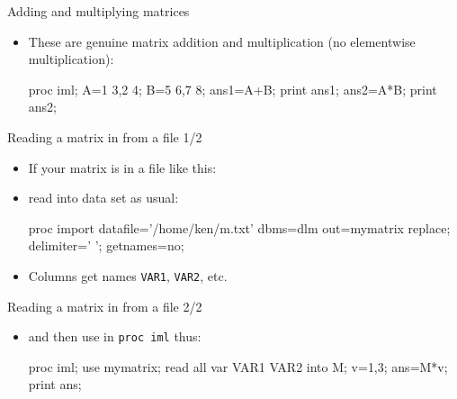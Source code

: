 \documentclass[unknownkeysallowed]{beamer}\usepackage[]{graphicx}\usepackage[]{color}
\begin{document}
\begin{frame}[fragile]{Adding and multiplying matrices}
  
  \begin{itemize}
  \item These are genuine matrix addition and multiplication (no
    elementwise multiplication):
    
    \begin{Sascode}[store=ime]
proc iml;
  A={1 3,2 4};
  B={5 6,7 8};
  ans1=A+B; 
  print ans1;
  ans2=A*B;
  print ans2;
    \end{Sascode}
    
    
  \end{itemize}
  
\end{frame}

\begin{frame}[fragile]{Reading a matrix in from a file 1/2}
  
  \begin{itemize}
  \item If your matrix is in a file like this:
    

\item read into data set as usual:
  
    \begin{Datastep}
proc import
  datafile='/home/ken/m.txt'
    dbms=dlm
    out=mymatrix
    replace;
  delimiter=' ';
  getnames=no; 
    \end{Datastep}
    
  \item Columns get names \texttt{VAR1}, \texttt{VAR2}, etc.
    
  \end{itemize}
  
\end{frame}


\begin{frame}[fragile]{Reading a matrix in from a file 2/2}
  
  \begin{itemize}
  \item and then use in \texttt{proc iml} thus:
    
    \begin{Sascode}[store=imf]
proc iml;
  use mymatrix;
  read all var {VAR1 VAR2} into M;
  v={1,3};
  ans=M*v;
  print ans;
    \end{Sascode}
    
    
  \end{itemize}
  
\end{frame}
\end{document}
